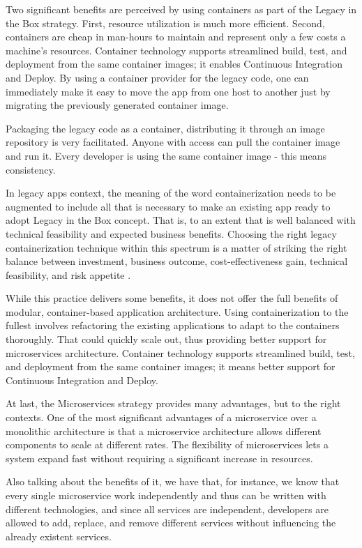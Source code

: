 Two significant benefits are perceived by using containers as part of the Legacy
in the Box strategy. First, resource utilization is much more efficient. Second,
containers are cheap in man-hours to maintain and represent only a few costs a
machine's resources. Container technology supports streamlined build, test, and
deployment from the same container images; it enables Continuous Integration and
Deploy. By using a container provider for the legacy code, one can immediately
make it easy to move the app from one host to another just by migrating the
previously generated container image.  

Packaging the legacy code as a container, distributing it through an image
repository is very facilitated. Anyone with access can pull the container image
and run it. Every developer is using the same container image - this means
consistency. 

In legacy apps context, the meaning of the word containerization needs to be
augmented to include all that is necessary to make an existing app ready to
adopt Legacy in the Box concept. That is, to an extent that is well balanced
with technical feasibility and expected business benefits. Choosing the right
legacy containerization technique within this spectrum is a matter of striking
the right balance between investment, business outcome, cost-effectiveness gain,
technical feasibility, and risk appetite \cite{ibm2020}.

While this practice delivers some benefits, it does not offer the full benefits
of modular, container-based application architecture. Using containerization to
the fullest involves refactoring the existing applications to adapt to the
containers thoroughly. That could quickly scale out, thus providing better
support for microservices architecture. Container technology supports
streamlined build, test, and deployment from the same container images; it means
better support for Continuous Integration and Deploy.

At last, the Microservices strategy provides many advantages, but to the right
contexts. One of the most significant advantages of a microservice over a
monolithic architecture is that a microservice architecture allows different
components to scale at different rates. The flexibility of microservices lets a
system expand fast without requiring a significant increase in resources. 

Also talking about the benefits of it, we have that, for instance, we know that
every single microservice work independently and thus can be written with
different technologies, and since all services are independent, developers are
allowed to add, replace, and remove different services without influencing the
already existent services. 

